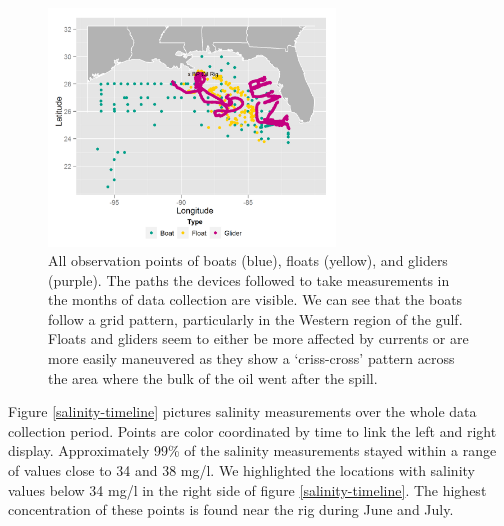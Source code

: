 \documentclass[authoryear,12pt]{elsarticle}
\newcommand{\red}[1]{{\color{red} #1}}
\begin{document}
\begin{figure}[htbp] %
   \centering
   \includegraphics[width=3in]{boats-floats-gliders.png} 
   \caption{All observation points of boats (blue), floats (yellow), and gliders (purple). The paths the devices followed to take measurements in the months of data collection are visible. We can see that the boats follow a grid pattern, particularly in the Western region of the gulf. Floats and gliders seem to either be more affected by currents or are more easily maneuvered as they show a `criss-cross' pattern across the area where the bulk of the oil went after the spill.}
   \label{Boats, Floats and Gliders}
\end{figure}
Figure \ref{salinity-timeline} pictures salinity measurements over the whole data collection period. Points are color coordinated by time to link the left and right display. Approximately 99\% of the salinity measurements stayed within a range of values close {to} 34 and 38 mg/l.
{We highlighted the locations with salinity values below 34 mg/l} in the right side of figure \ref{salinity-timeline}. The highest concentration of these points is found near the rig during June and July.
\end{document}
